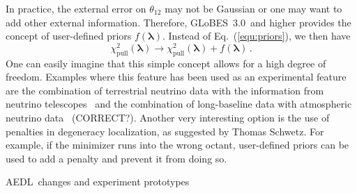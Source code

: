 \documentclass[12pt,a4paper]{article}
\makeatletter
\renewcommand{\section}{\@startsection{section}{1}{0em}{-\baselineskip}%
{\baselineskip}{\normalfont\large\bfseries}}
\newcommand{\eq}{Eq.}
\newcommand{\GLOBESN}{{\sf GLoBES~3.0}}
\newcommand{\AEDL}{{\sf AEDL}}
\newcommand{\equ}[1]{\eq~(\ref{equ:#1})}
\makeatother
\begin{document}
In practice, the external error on $\theta_{12}$ may not be Gaussian or one may
want to add other external information. Therefore,
\GLOBESN\ and higher provides the concept of user-defined priors  $f(\boldsymbol{\lambda})$. 
Instead of \equ{priors}, we then have
\begin{equation}
 \chi^2_{\mathrm{pull}}(\boldsymbol{\lambda}) \rightarrow \chi^2_{\mathrm{pull}}(\boldsymbol{\lambda})  + f(\boldsymbol{\lambda}) \, .
\label{equ:userpriors}
\end{equation}
One can easily imagine that this simple concept allows for a high degree of freedom. Examples where
this feature has been used as an experimental feature are the combination of terrestrial neutrino
data with the information from neutrino telescopes~\cite{Winter:2006ce} and the combination of long-baseline data with atmospheric neutrino data~\cite{Huber:2005ep,Campagne:2006yx} (CORRECT?).
Another very interesting option is the use of penalties in degeneracy localization, as suggested by Thomas
Schwetz. For example, if the minimizer runs into the wrong octant, user-defined priors can be
used to add a penalty and prevent it from doing so.

\section{\AEDL\ changes and experiment prototypes}
\end{document}

